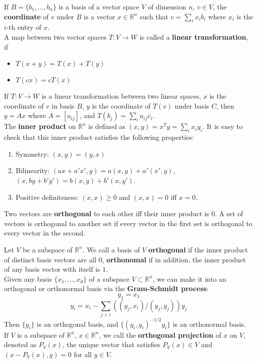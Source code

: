 \documentclass[20pt]{article} %
\theoremstyle{break}
\begin{document}
If $B=\{b_1, \dots, b_n\}$ is a basis of a vector space $V$ of dimension $n$, $v\in V$, the {\bf coordinate} of $v$ under $B$ is a vector $x\in\mathbb{R}^n$ such that $v=\sum_ix_ib_i$ where $x_i$ is the $i$-th entry of $x$.\\

A map between two vector spaces $T: V\rightarrow W$ is called a {\bf linear transformation}, if
\begin{itemize}
\item $T(x+y)=T(x)+T(y)$
\item $T(cx)=cT(x)$
\end{itemize}

If $T: V\rightarrow W$ is a linear transformation between two linear spaces, $x$ is the coordinate of $v$ in basis $B$, $y$ is the coordinate of $T(v)$ under basis $C$, then $y=Ax$ where $A=[a_{ij}]$, and $T(b_j)=\sum_ia_{ij}c_i$.\\

The {\bf inner product} on $\mathbb{R}^n$ is defined as $(x, y)=x^Ty=\sum_ix_iy_i$. It is easy to check that this inner product satisfies the following properties:
\begin{enumerate}
\item Symmetry: $(x, y)=(y, x)$
\item Bilinearity: $(ax+a'x', y)=a(x, y)+a'(x', y)$, $(x, by+b'y')=b(x, y)+b'(x, y')$.
\item Positive definiteness: $(x, x)\geq 0$ and $(x, x)=0$ iff $x=0$.
\end{enumerate}

Two vectors are {\bf orthogonal} to each other iff their inner product is $0$. A set of vectors is orthogonal to another set if every vector in the first set is orthogonal to every vector in the second.

Let $V$ be a subspace of $\mathbb{R}^n$. We call a basis of $V$ {\bf orthogonal} if the inner product of distinct basis vectors are all $0$, {\bf orthonomal} if in addition, the inner product of any basis vector with itself is $1$.\\

Given any basis $\{x_1, \dots, x_d\}$ of a subspace $V\subset \mathbb{R}^n$, we can make it into an orthogonal or orthonormal basis via the {\bf Gram-Schmidt process}:
\[y_1=x_1\]
\[y_i=x_i-\sum_{j<i}((y_j, x_i)/(y_j, y_j))y_j\]
Then $\{y_i\}$ is an orthogonal basis, and $\{(y_i, y_i)^{-1/2}y_i\}$ is an orthonormal basis.\\

If $V$ is a subspace of $\mathbb{R}^n$, $x\in \mathbb{R}^n$, we call the {\bf orthogonal projection} of $x$ on $V$, denoted as $P_V(x)$, the unique vector that satisfies $P_V(x)\in V$ and $(x-P_V(x), y)=0$ for all $y\in V$.\\
\end{document}
